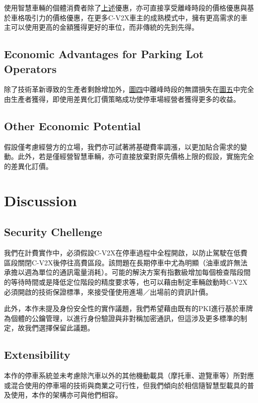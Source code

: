 \documentclass[sigconf,authorversion,nonacm,screen]{acmart}
\begin{document}
\quad 使用智慧車輛的個體消費者除了\hyperref[sec:ET]{上述}優惠，亦可直接享受離峰時段的價格優惠與基於車格吸引力的價格優惠，在更多C-V2X車主的成熟模式中，擁有更高需求的車主可以使用更高的金額獲得更好的車位，而非傳統的先到先得。

\subsection{Economic Advantages for Parking Lot Operators}

\quad 除了技術革新導致的生產者剩餘增加外，\hyperref[fig:TM]{圖四}中離峰時段的無謂損失在\hyperref[fig:OM]{圖五}中完全由生產者獲得，即使用差異化訂價策略成功使停車場經營者獲得更多的收益。


\subsection{Other Economic Potential}

\quad 假設僅考慮經營方的立場，我們亦可試著將基礎費率調漲，以更加貼合需求的變動。此外，若是僅經營智慧車輛，亦可直接放棄對原先價格上限的假設，實施完全的差異化訂價。

\section{Discussion}

\subsection{Security Chellenge}

\quad 我們在計費實作中，必須假設C-V2X在停車過程中全程開啟，以防止駕駛在低費區段關閉C-V2X後停往高費區段。該問題在長期停車中尤為明顯（油車或許無法承擔以週為單位的通訊電量消耗）。可能的解決方案有指數級增加每個檢查階段間的等待時間或是降低定位階段的精度要求等，也可以藉由制定車輛啟動時C-V2X必須開啟的技術保證標準，來接受僅使用進場／出場前的資訊計價。

此外，本作未提及身份安全性的實作議題，我們希望藉由既有的PKI進行基於車牌為個體的公鑰管理，以進行身份驗證與非對稱加密通訊，但這涉及更多標準的制定，故我們選擇保留此議題。

\subsection{Extensibility}

\quad 本作的停車系統並未考慮除汽車以外的其他機動載具（摩托車、遊覽車等）所對應或混合使用的停車場的技術與商業之可行性，但我們傾向於相信隨智慧型載具的普及使用，本作的架構亦可與他們相容。
\end{document}

